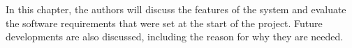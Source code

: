 In this chapter, the authors will discuss the features of the system and evaluate the software requirements
that were set at the start of the project.
Future developments are also discussed, including the reason for why they are needed.
